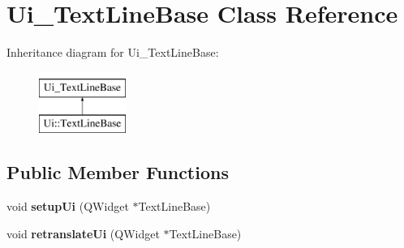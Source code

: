 \hypertarget{class_ui___text_line_base}{}\section{Ui\+\_\+\+Text\+Line\+Base Class Reference}
\label{class_ui___text_line_base}
Inheritance diagram for Ui\+\_\+\+Text\+Line\+Base\+:\begin{figure}[H]
\begin{center}
\leavevmode
\includegraphics[height=2.000000cm]{class_ui___text_line_base}
\end{center}
\end{figure}
\subsection*{Public Member Functions}
\begin{DoxyCompactItemize}
\item 
\mbox{\label{class_ui___text_line_base_a2c64f2bbe3c7dee9e81897cbabedf53b}} 
void {\bfseries setup\+Ui} (Q\+Widget $\ast$Text\+Line\+Base)
\item 
\mbox{\label{class_ui___text_line_base_a6df01b6513a03fdb0d45a5cd39681ed9}} 
void {\bfseries retranslate\+Ui} (Q\+Widget $\ast$Text\+Line\+Base)
\end{DoxyCompactItemize}
